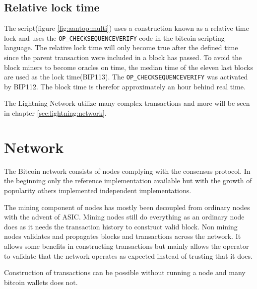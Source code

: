 \subsection{Relative lock time}
\label{sec:rlt}

The script(figure \ref{fig:aantop:multi}) uses a construction known as a relative time lock and uses the \texttt{OP\_CHECKSEQUENCEVERIFY} code in the bitcoin scripting language\cite{bip:0068:sequence:lock:time}. The relative lock time will only become true after the defined time since the parent transaction were included in a block has passed. To avoid the block miners to become oracles on time, the median time of the eleven last blocks are used as the lock time(BIP113\cite{bip:0113:median:time:passed}). The \texttt{OP\_CHECKSEQUENCEVERIFY} was activated by BIP112\cite{bip:0112:sequence:lock:time:soft:fork}. The block time is therefor approximately an hour behind real time.

The Lightning Network utilize many complex transactions and more will be seen in chapter \ref{sec:lightning:network}.

\section{Network}

The Bitcoin network consists of nodes complying with the consensus protocol. In the beginning only the reference implementation available but with the growth of popularity others implemented independent implementations\cite{repository:bitcoin}\cite{repository:btcd}\cite{repository:neutrino}.

The mining component of nodes has mostly been decoupled from ordinary nodes with the advent of ASIC. Mining nodes still do everything as an ordinary node does as it needs the transaction history to construct valid block. Non mining nodes validates and propagates blocks and transactions across the network. It allows some benefits in constructing transactions but mainly allows the operator to validate that the network operates as expected instead of trusting that it does.

Construction of transactions can be possible without running a node and many bitcoin wallets does not.

 

